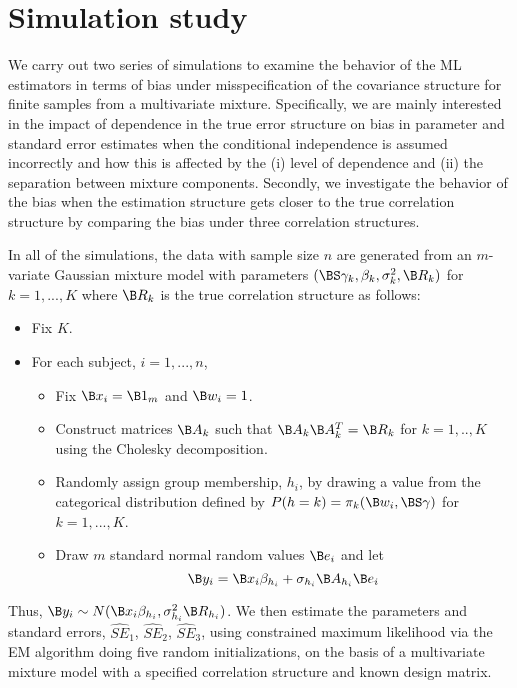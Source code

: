  \section{Simulation study}\label{chp2:sim}
We carry out two series of simulations to examine the behavior of the ML estimators in terms of bias under misspecification of the covariance structure for finite samples from a multivariate mixture. Specifically, we are mainly interested in the impact of dependence in the true error structure on bias in parameter and standard error estimates when the conditional independence is assumed incorrectly and how this is affected by the (i) level of dependence and (ii) the separation between mixture components. Secondly, we investigate the behavior of the bias when the estimation structure gets closer to the true correlation structure by comparing the bias under three correlation structures.

In all of the simulations, the data with sample size $n$ are generated from an $m$-variate Gaussian mixture model with parameters $(\BS\gamma_{k},\beta_{k},\sigma^{2}_{k},\B R_k)$ for $k=1,...,K$ where $\B R_k$ is the true correlation structure as follows:
\begin{itemize}
\item Fix $K$. 
\item For each subject, $i=1,...,n$, 
\begin{itemize}
\item Fix $\B x_{i} = \B 1_{m}$ and $\B w_{i}=1$.
\item Construct matrices $\B A_k$ such that $\B A_k\B A_k^{T}=\B R_k$ for $k=1,..,K$ using the Cholesky decomposition. 
\item Randomly assign group membership, $h_{i}$, by drawing a value from the categorical distribution defined by $P(h=k)=\pi_{k}(\B w_{i},\BS\gamma)$ for $k=1,...,K$. 
\item Draw $m$ standard normal random values $\B e_{i}$ and let
$$\B y_{i}=\B x_{i}\beta_{h_{i}}+\sigma_{h_{i}}\B A_{h_{i}}\B e_{i}$$
\end{itemize}
\end{itemize}
Thus, $\B y_{i}\sim N(\B x_{i}\beta_{h_{i}},\sigma_{h_{i}}^{2}\B R_{h_{i}})$. We then estimate the parameters and standard errors, $\widehat{SE}_1$, $\widehat{SE}_2$, $\widehat{SE}_3$, using constrained maximum likelihood via the EM algorithm \cite{hathaway1985} doing five random initializations, on the basis of a multivariate mixture model with a specified correlation structure and known design matrix.


